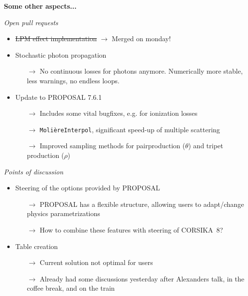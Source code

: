 \documentclass[aspectratio=1610, 9pt]{beamer}
\begin{document}
\begin{frame}

  \textbf{Some other aspects...}

   \vspace{3mm}

  \emph{Open pull requests}

    \begin{itemize}
      \item \sout{LPM effect implementation} $\rightarrow$ Merged on monday!
      \item Stochastic photon propagation
      \begin{itemize}
        \item[$\rightarrow$] No continuous losses for photons anymore. Numerically more stable, less warnings, no endless loops.
      \end{itemize}
      \item Update to PROPOSAL 7.6.1
      \begin{itemize}
        \item[$\rightarrow$] Includes some vital bugfixes, e.g. for ionization losses
        \item[$\rightarrow$] \texttt{MolièreInterpol}, significant speed-up of multiple scattering
        \item[$\rightarrow$] Improved sampling methods for pairproduction ($\theta$) and tripet production ($\rho$)
      \end{itemize}
    \end{itemize}

  \emph{Points of discussion}

  \begin{itemize}
    \item Steering of the options provided by PROPOSAL
    \begin{itemize}
        \item[$\rightarrow$] PROPOSAL has a flexible structure, allowing users to adapt/change physics parametrizations
        \item[$\rightarrow$] How to combine these features with steering of CORSIKA~8?
    \end{itemize}
    \item Table creation
    \begin{itemize}
        \item[$\rightarrow$] Current solution not optimal for users
        \item[$\rightarrow$] Already had some discussions yesterday after Alexanders talk, in the coffee break, and on the train
    \end{itemize}
   \end{itemize}


\end{frame}
\end{document}
